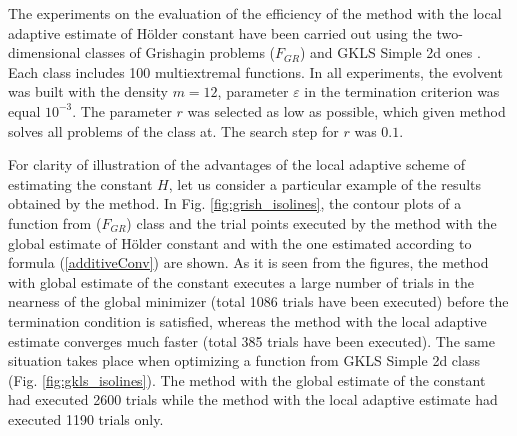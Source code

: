 \documentclass[procedia]{easychair}
\begin{document}
The experiments on the evaluation of the efficiency of the method with the local
adaptive estimate of Hölder constant have been carried out using the two-dimensional
classes of Grishagin problems (\(F_{GR}\)) \cite{grishaginClass} and GKLS Simple 2d ones \cite{gklsClass}. Each class
includes 100 multiextremal functions. In all experiments, the evolvent was built
with the density \(m = 12\), parameter \(\varepsilon\) in the termination criterion was equal \(10^{-3}\).
The parameter \(r\) was selected as low as possible, which given method solves all
problems of the class at. The search step for \(r\) was \(0.1\).
\par
For clarity of illustration of the advantages of the local adaptive scheme of estimating
the constant \(H\), let us consider a particular example of the results obtained by the method.
In Fig. \ref{fig:grish_isolines}, the contour plots of a function from (\(F_{GR}\)) class and the trial
points executed by the method with the global estimate of Hölder constant and with
the one estimated according to formula (\ref{additiveConv}) are shown. As it is
seen from the figures, the method with global estimate of the constant executes a
large number of trials in the nearness of the global minimizer (total 1086 trials
have been executed) before the termination condition is satisfied, whereas the method
with the local adaptive estimate converges much faster (total 385 trials have been executed).
The same situation takes place when optimizing a function from GKLS Simple 2d class (Fig. \ref{fig:gkls_isolines}).
The method with the global estimate of the constant had executed 2600 trials while
the method with the local adaptive estimate had executed 1190 trials only.
\end{document}
